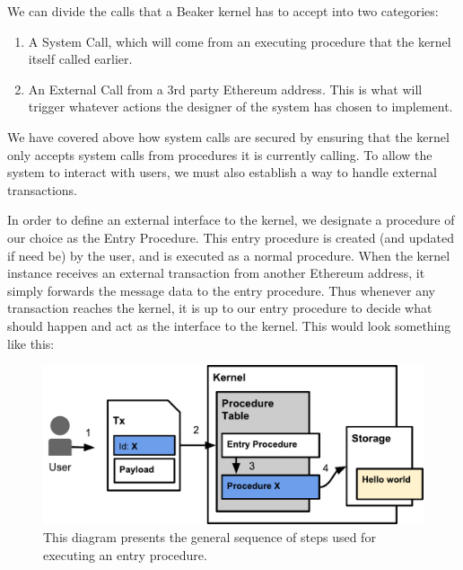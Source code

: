 \documentclass[english,a4paper]{article}
\begin{document}
We can divide the calls that a Beaker kernel has to accept into two categories:

\begin{enumerate}
\def\labelenumi{\arabic{enumi}.}
\item
  A System Call, which will come from an executing procedure that the
  kernel itself called earlier.
\item
  An External Call from a 3rd party Ethereum address. This is what will
  trigger whatever actions the designer of the system has chosen to
  implement.
\end{enumerate}

We have covered above how system calls are secured by ensuring that the kernel
only accepts system calls from procedures it is currently calling. To allow the
system to interact with users, we must also establish a way to handle external
transactions.

In order to define an external interface to the kernel, we designate a
procedure of our choice as the Entry Procedure. This entry
procedure is created (and updated if need be) by the user, and is
executed as a normal procedure. When the kernel instance receives an
external transaction from another Ethereum address, it simply forwards
the message data to the entry procedure. Thus whenever any transaction
reaches the kernel, it is up to our entry procedure to decide what
should happen and act as the interface to the kernel. This would look something
like this:

\begin{figure}[htbp]
\centering
\includegraphics[width=1\textwidth]{media/EntryProcedure.pdf}
\caption{This diagram presents the general sequence of steps used
for executing an entry procedure.}
\end{figure}
\end{document}
